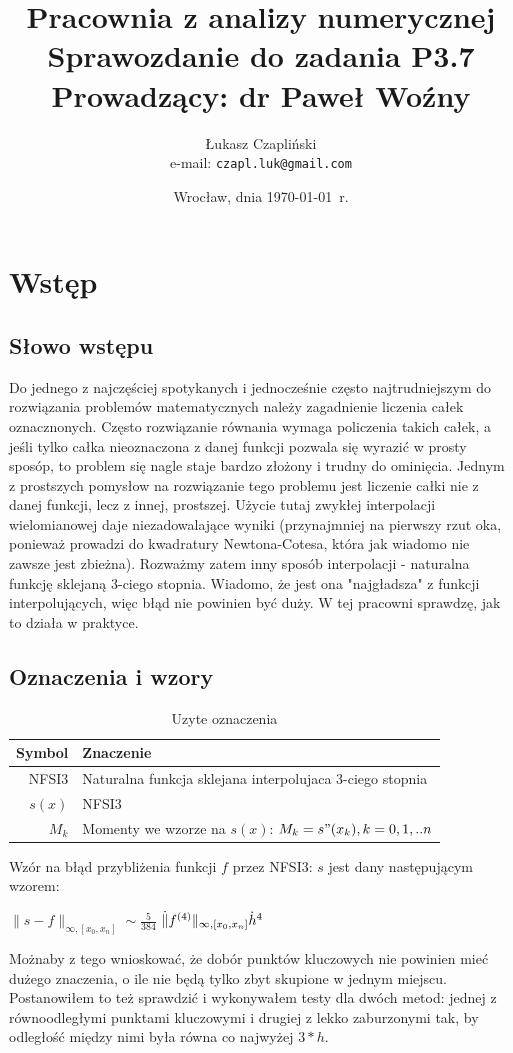 \documentclass[11pt,wide]{mwart}
\title{{\textbf{Pracownia z analizy numerycznej\\}}
       {\Large Sprawozdanie do zadania \textbf{P3.7}\\}
       {\large Prowadzący: dr Paweł Woźny}}
\author{Łukasz Czapliński\\  e-mail: \texttt{czapl.luk@gmail.com}}
\date{Wrocław, dnia \today\ r.}
\begin{document}
\thispagestyle{empty}
\maketitle
\newpage
\section{Wstęp}
\subsection{Słowo wstępu}
Do jednego z najczęściej spotykanych i jednocześnie często najtrudniejszym do rozwiązania problemów matematycznych należy zagadnienie liczenia całek oznacznonych. Często rozwiązanie równania wymaga policzenia takich całek, a jeśli tylko całka nieoznaczona z danej funkcji pozwala się wyrazić w prosty sposóp, to problem się nagle staje bardzo złożony i trudny do ominięcia. Jednym z prostszych pomysłow na rozwiązanie tego problemu jest liczenie całki nie z danej funkcji, lecz z innej, prostszej. Użycie tutaj zwykłej interpolacji wielomianowej daje niezadowalające wyniki (przynajmniej na pierwszy rzut oka, ponieważ prowadzi do kwadratury Newtona-Cotesa, która jak wiadomo nie zawsze jest zbieżna). Rozważmy zatem inny sposób interpolacji - naturalna funkcję sklejaną 3-ciego stopnia. Wiadomo, że jest ona "najgładsza" z funkcji interpolujących, więc błąd nie powinien być duży. W tej pracowni sprawdzę, jak to działa w praktyce.
\subsection{Oznaczenia i wzory}
\begin{table}[!h]
  \centering
  \begin{tabular}{r | l}
    \hline
    Symbol & Znaczenie \\
    \hline
    NFSI3 & Naturalna funkcja sklejana interpolujaca 3-ciego stopnia \\
    $s(x)$ & NFSI3 \\
    $M_k$ & Momenty we wzorze na $s(x)$: $M_k=s"(x_k), k=0,1,..n$\\
    \hline
  \end{tabular}
  \caption{Uzyte oznaczenia}
\end{table}
Wzór na błąd przybliżenia funkcji $f$  przez NFSI3: $s$ jest dany następującym wzorem:\\
\begin{center}
  $\lVert{s-f}\rVert_{\infty,[x_0,x_n]}\sim\frac{5}{384}$ $\dot\lVert{f^{(4)}}\rVert_{\infty,[x_0,x_n]}\dot h^4$
  \label{WZOR}
\end{center}
Możnaby z tego wnioskować, że dobór punktów kluczowych nie powinien mieć dużego znaczenia, o ile nie będą tylko zbyt skupione w jednym miejscu. Postanowiłem to też sprawdzić i wykonywałem testy dla dwóch metod: jednej z równoodległymi punktami kluczowymi i drugiej z lekko zaburzonymi tak, by odległość między nimi była równa co najwyżej $3*h$.
\end{document}
